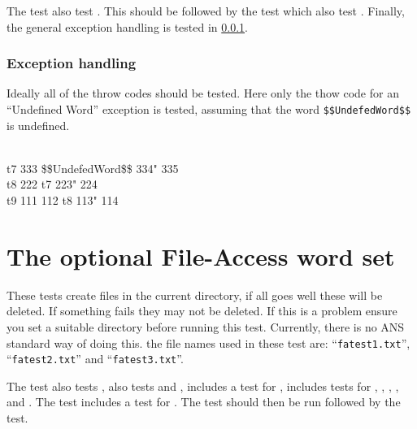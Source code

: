The test  also test .  This should
be followed by the test  which also test
.  Finally, the general exception handling is tested in
\ref{test:throw}.

\setcounter{subsection}{3}
\setcounter{subsubsection}{5}
\subsubsection{Exception handling}
\label{test:throw}

Ideally all of the throw codes should be tested.  Here only the
thow code for an ``Undefined Word'' exception is tested, assuming
that the word \texttt{\$\$UndefedWord\$\$} is undefined.

\begin{tt}
 \\
\word{:} t7  333 \$\$UndefedWord\$\$ 334"  335 \word{;} \\
\word{:} t8  222 t7 223"  224 \word{;} \\
\word{:} t9  111 112 t8 113"  114 \word{;}
\end{tt}






\section{The optional File-Access word set} %

These tests create files in the current directory, if all goes well
these will be deleted.  If something fails they may not be deleted.
If this is a problem ensure you set a suitable directory before
running this test.  Currently, there is no ANS standard way of doing
this.  the file names used in these test are:
``\texttt{fatest1.txt}'', ``\texttt{fatest2.txt}'' and
``\texttt{fatest3.txt}''.

The test  also tests ,
 \linebreak also tests  and ,
 includes a test for , \linebreak
{} includes tests for ,
, , \linebreak
{}, and .
The  test includes a test for .
The test \linebreak {} should then be run followed by
the  test.

